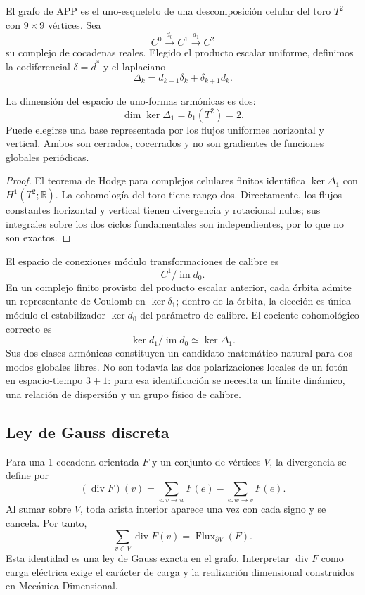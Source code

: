 El grafo de APP es el uno-esqueleto de una descomposición celular del toro
\(T^2\) con \(9\times9\) vértices. Sea
\[
 C^0\xrightarrow{d_0}C^1\xrightarrow{d_1}C^2
\]
su complejo de cocadenas reales. Elegido el producto escalar uniforme,
definimos la codiferencial \(\delta=d^*\) y el laplaciano
\[
 \Delta_k=d_{k-1}\delta_k+\delta_{k+1}d_k.
\]

\begin{theorem}
\label{v:rec:completaciones:statement:04}
La dimensión del espacio de uno-formas armónicas es dos:
\[
 \dim\ker\Delta_1=b_1(T^2)=2.
\]
Puede elegirse una base representada por los flujos uniformes horizontal y
vertical. Ambos son cerrados, cocerrados y no son gradientes de funciones
globales periódicas.
\end{theorem}

\begin{proof}
El teorema de Hodge para complejos celulares finitos identifica
\(\ker\Delta_1\) con \(H^1(T^2;\mathbb R)\). La cohomología del toro tiene
rango dos. Directamente, los flujos constantes horizontal y vertical tienen
divergencia y rotacional nulos; sus integrales sobre los dos ciclos
fundamentales son independientes, por lo que no son exactos.
\end{proof}

El espacio de conexiones módulo transformaciones de calibre es
\[
 C^1/\operatorname{im}d_0.
\]
En un complejo finito provisto del producto escalar anterior, cada órbita
admite un representante de Coulomb en \(\ker\delta_1\); dentro de la órbita,
la elección es única módulo el estabilizador \(\ker d_0\) del parámetro de
calibre. El cociente cohomológico correcto es
\[
 \ker d_1/\operatorname{im}d_0
 \simeq \ker\Delta_1 .
\]
Sus dos clases armónicas constituyen un candidato matemático natural para
dos modos globales libres. No son todavía las dos polarizaciones locales de
un fotón en espacio-tiempo \(3+1\): para esa identificación se necesita un
límite dinámico, una relación de dispersión y un grupo físico de calibre.

\subsection{Ley de Gauss discreta}
\label{v:rec:completaciones:section:09}

Para una 1-cocadena orientada \(F\) y un conjunto de vértices \(V\), la
divergencia se define por
\[
 (\operatorname{div}F)(v)=
 \sum_{e:v\to w}F(e)-\sum_{e:w\to v}F(e).
\]
Al sumar sobre \(V\), toda arista interior aparece una vez con cada signo y
se cancela. Por tanto,
\[
 \boxed{
 \sum_{v\in V}\operatorname{div}F(v)
 =\operatorname{Flux}_{\partial V}(F).}
\]
Esta identidad es una ley de Gauss exacta en el grafo. Interpretar
\(\operatorname{div}F\) como carga eléctrica exige el carácter de carga y la
realización dimensional construidos en Mecánica Dimensional.

